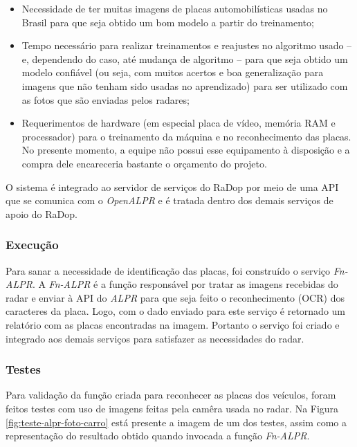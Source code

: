 \begin{itemize}
    \item Necessidade de ter muitas imagens de placas automobilísticas usadas no Brasil para que seja obtido um bom modelo a partir do treinamento;
    \item Tempo necessário para realizar treinamentos e reajustes no algoritmo usado -- e, dependendo do caso, até mudança de algoritmo -- para que seja obtido um modelo confiável (ou seja, com muitos acertos e boa generalização para imagens que não tenham sido usadas no aprendizado) para ser utilizado com as fotos que são enviadas pelos radares;
    \item Requerimentos de hardware (em especial placa de vídeo, memória RAM e processador) para o treinamento da máquina e no reconhecimento das placas. No presente momento, a equipe não possui esse equipamento à disposição e a compra dele encareceria bastante o orçamento do projeto.
\end{itemize}

O sistema é integrado ao servidor de serviços do RaDop por meio de uma API que se comunica com o \textit{OpenALPR} e é tratada dentro dos demais serviços de apoio do RaDop.

\subsubsection{Execução}

Para sanar a necessidade de identificação das placas, foi construído o serviço \textit{Fn-ALPR}. A \textit{Fn-ALPR} é a função responsável por tratar as imagens recebidas do radar e enviar à API do \textit{ALPR} para que seja feito o reconhecimento (OCR) dos caracteres da placa. Logo, com o dado enviado para este serviço é retornado um relatório com as placas encontradas na imagem. Portanto o serviço foi criado e integrado aos demais serviços para satisfazer as necessidades do radar.


\subsubsection{Testes}

Para validação da função criada para reconhecer as placas dos veículos, foram feitos testes com uso de imagens feitas pela camêra usada no radar. Na Figura \ref{fig:teste-alpr-foto-carro} está presente a imagem de um dos testes, assim como a representação do resultado obtido quando invocada a função \textit{Fn-ALPR}.

